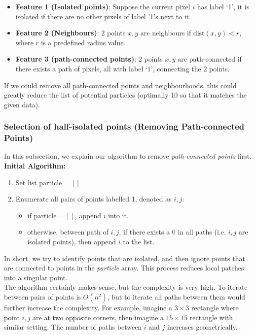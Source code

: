 \documentclass[11pt,a4paper]{scrartcl}
\begin{document}
\begin{itemize}
    \item \textbf{Feature 1 (Isolated points)}: Suppose the current pixel $i$ has label `1', it is isolated if there are no other pixels of label '1's next to it.
    
    \item \textbf{Feature 2 (Neighbours)}: 2 points $x,y$ are neighbours if $\text{dist}(x,y) < r$, where $r$ is a predefined radius value.

    \item \textbf{Feature 3 (path-connected points)}: 2 points $x,y$ are path-connected if there exists a path of pixels, all with label `1', connecting the 2 points.
\end{itemize}

If we could remove all path-connected points and neighbourhoods, this could greatly reduce the list of potential particles (optimally 10 so that it matches the given data).

\subsubsection{Selection of half-isolated points (Removing Path-connected Points)}
In this subsection, we explain our algorithm to remove \textit{path-connected points} first.\\

\textbf{Initial Algorithm:}
\begin{enumerate}
    \item Set list $\text{particle} = []$
    \item Enumerate all pairs of points labelled 1, denoted as $i, j$:
    \begin{itemize}
        \item if $\text{particle} = []$, append $i$ into it. 
        \item otherwise, between path of $i, j$, if there exists a 0 in all paths (i.e. $i, j$ are isolated points), then append $i$ to the list.
    \end{itemize}
\end{enumerate}

In short, we try to identify points that are isolated, and then ignore points that are connected to points in the \textit{particle} array. This process reduces local patches into a singular point.\\

The algorithm certainly makes sense, but the complexity is very high. To iterate between pairs of points is $O(n^2)$, but to iterate all paths between them would further increase the complexity. For example, imagine a $3\times 3$ rectangle where point $i, j$ are at two opposite corners, then imagine a $15\times 15$ rectangle with similar setting. The number of paths between $i$ and $j$ increases geometrically. \\
\end{document}
